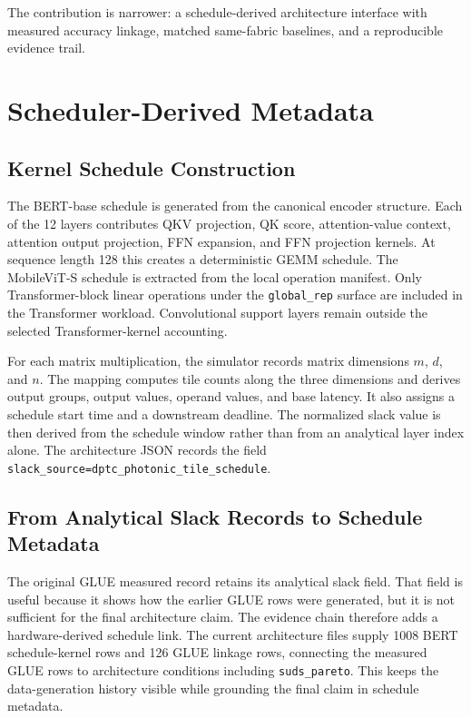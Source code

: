 \documentclass[10pt,journal]{IEEEtran}
\begin{document}
The contribution is narrower: a schedule-derived architecture interface with
measured accuracy linkage, matched same-fabric baselines, and a reproducible
evidence trail.

\section{Scheduler-Derived Metadata}

\subsection{Kernel Schedule Construction}

The BERT-base schedule is generated from the canonical encoder structure.
Each of the 12 layers contributes QKV projection, QK score, attention-value
context, attention output projection, FFN expansion, and FFN projection
kernels.
At sequence length 128 this creates a deterministic GEMM schedule.
The MobileViT-S schedule is extracted from the local operation manifest.
Only Transformer-block linear operations under the \texttt{global\_rep}
surface are included in the Transformer workload.
Convolutional support layers remain outside the selected Transformer-kernel
accounting.

For each matrix multiplication, the simulator records matrix dimensions
\(m\), \(d\), and \(n\). The mapping computes tile counts along the three
dimensions and derives output groups, output values, operand values, and base
latency. It also assigns a schedule start time and a downstream deadline. The
normalized slack value is then derived from the schedule window rather than
from an analytical layer index alone. The architecture JSON records the field
\texttt{slack\_source=dptc\_photonic\_tile\_schedule}.

\subsection{From Analytical Slack Records to Schedule Metadata}

The original GLUE measured record retains its analytical slack field. That
field is useful because it shows how the earlier GLUE rows were generated, but
it is not sufficient for the final architecture claim. The evidence chain
therefore adds a hardware-derived schedule link. The current architecture files
supply 1008 BERT schedule-kernel rows and 126 GLUE linkage rows, connecting the
measured GLUE rows to architecture conditions including
\texttt{suds\_pareto}. This keeps the data-generation history visible while
grounding the final claim in schedule metadata.
\end{document}
